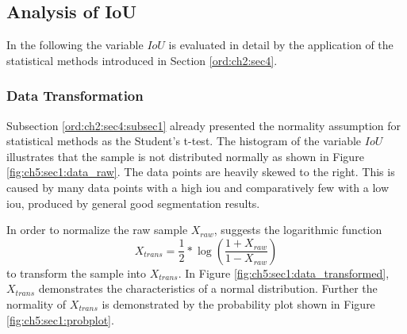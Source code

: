 
\subsection{Analysis of IoU}\label{ord:ch5:sec1:subsec2}

In the following the variable $IoU$ is evaluated in detail by the application of the statistical methods introduced in Section \ref{ord:ch2:sec4}.

\subsubsection{Data Transformation}
Subsection \ref{ord:ch2:sec4:subsec1} already presented the normality assumption for statistical methods as the Student's t-test.
The histogram of the variable $IoU$ illustrates that the sample is not distributed normally as shown in Figure \ref{fig:ch5:sec1:data_raw}.
The data points are heavily skewed to the right. 
This is caused by many data points with a high \gls{iou} and comparatively few with a low \gls{iou}, produced by general good segmentation results.

In order to normalize the raw sample $X_{raw}$, \cite{PS16-Statistics} suggests the logarithmic function
\begin{equation} \label{equ:trans_iou}
	X_{trans} = \frac{1}{2} * \log \left( \frac{1 + X_{raw}}{1 - X_{raw}}\right) 
\end{equation}
to transform the sample into $X_{trans}$.
In Figure \ref{fig:ch5:sec1:data_transformed}, $X_{trans}$ demonstrates the characteristics of a normal distribution.
Further the normality of $X_{trans}$ is demonstrated by the probability plot shown in Figure \ref{fig:ch5:sec1:probplot}.

